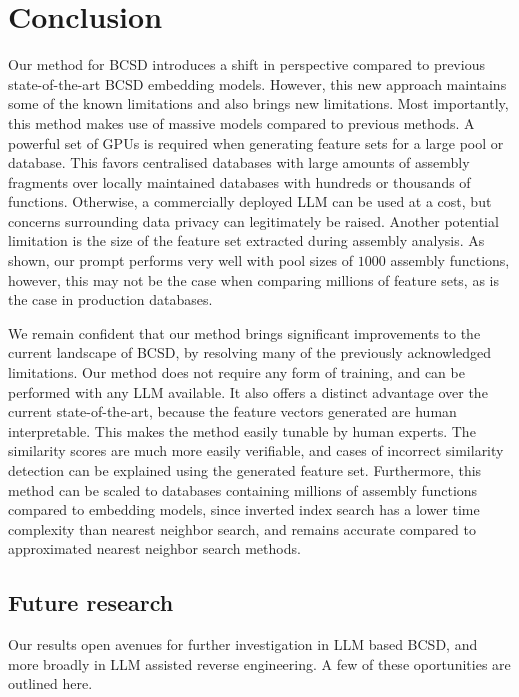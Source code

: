 \section{Conclusion}

Our method for BCSD introduces a shift in perspective compared to previous state-of-the-art BCSD embedding models. However,
this new approach maintains some of the known limitations and also brings new limitations. Most importantly, this
method makes use of massive models compared to previous methods. A powerful set of GPUs is required when generating
feature sets for a large pool or database. This favors centralised databases with large amounts of assembly fragments over
locally maintained databases with hundreds or thousands of functions. Otherwise, a commercially deployed LLM can be used at a
cost, but concerns surrounding data privacy can legitimately be raised. Another potential limitation is the size of the feature
set extracted during assembly analysis. As shown, our prompt performs very well with pool sizes of \(1000\) assembly functions,
however, this may not be the case when comparing millions of feature sets, as is the case in production databases.

We remain confident that our method brings significant improvements to the current landscape of BCSD, by resolving
many of the previously acknowledged limitations. Our method does not require any form of training, and can be performed with any LLM
available. It also offers a distinct advantage over the current state-of-the-art, because the feature vectors generated are human
interpretable. This makes the method easily tunable by human experts. The similarity scores are much more easily verifiable, and
cases of incorrect similarity detection can be explained using the generated feature set. Furthermore, this method can be scaled to
databases containing millions of assembly functions compared to embedding models, since inverted index search has a lower time
complexity than nearest neighbor search, and remains accurate compared to approximated nearest neighbor search methods.

\subsection{Future research}

Our results open avenues for further investigation in LLM based BCSD, and more broadly in LLM assisted reverse engineering.
A few of these oportunities are outlined here.

